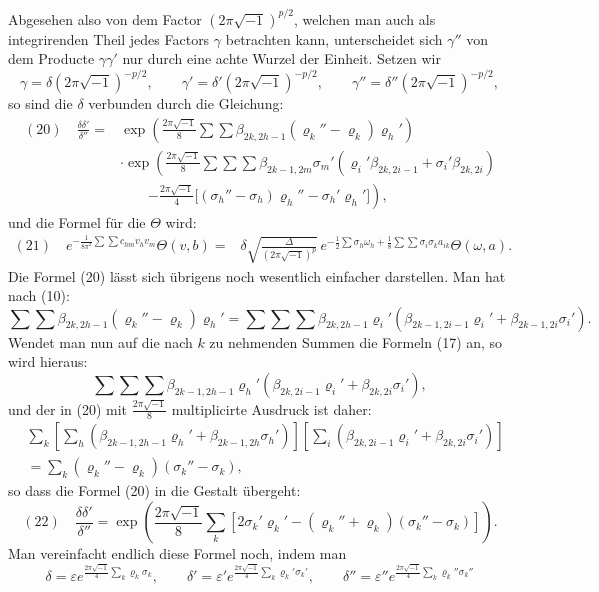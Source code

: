 \documentclass[10pt]{article}
\begin{document}
Abgesehen also von dem Factor \((2\pi\sqrt{-1})^{p/2}\), welchen man auch als integrirenden Theil jedes Factors \(\gamma\) betrachten kann, unterscheidet sich \(\gamma''\) von dem Producte \(\gamma\gamma'\) nur durch eine achte Wurzel der Einheit. Setzen wir
\[
\gamma=\delta(2\pi\sqrt{-1})^{-p/2},\qquad
\gamma'=\delta'(2\pi\sqrt{-1})^{-p/2},\qquad
\gamma''=\delta''(2\pi\sqrt{-1})^{-p/2},
\]
so sind die \(\delta\) verbunden durch die Gleichung:
\[
\begin{aligned}
(20)\quad
\frac{\delta\delta'}{\delta''}
={}&\exp\!\left(\frac{2\pi\sqrt{-1}}{8}\sum\sum\beta_{2k,2h-1}(\varrho_k''-\varrho_k)\varrho_h'\right)\\
&\cdot\exp\!\left(
\frac{2\pi\sqrt{-1}}{8}\sum\sum\sum\beta_{2k-1,2m}\sigma_m'(\varrho_i'\beta_{2k,2i-1}+\sigma_i'\beta_{2k,2i})
\right.\\
&\qquad\left.
-\frac{2\pi\sqrt{-1}}{4}\bigl[(\sigma_h''-\sigma_h)\varrho_h''-\sigma_h'\varrho_h'\bigr]\right),
\end{aligned}
\]
und die Formel für die \(\Theta\) wird:
\[
\begin{aligned}
(21)\quad
e^{-\frac{1}{8\pi^2}\sum\sum c_{hm}v_hv_m}\Theta(v,b)
={}&\delta\sqrt{\frac{\Delta}{(2\pi\sqrt{-1})^p}}\,
 e^{-\frac12\sum\sigma_h\omega_h+\frac18\sum\sum\sigma_i\sigma_ka_{ik}}\Theta(\omega,a).
\end{aligned}
\]
Die Formel (20) lässt sich übrigens noch wesentlich einfacher darstellen. Man hat nach (10):
\[
\sum\sum\beta_{2k,2h-1}(\varrho_k''-\varrho_k)\varrho_h'
=\sum\sum\sum\beta_{2k,2h-1}\varrho_i'(\beta_{2k-1,2i-1}\varrho_i'+\beta_{2k-1,2i}\sigma_i').
\]
Wendet man nun auf die nach \(k\) zu nehmenden Summen die Formeln (17) an, so wird hieraus:
\[
\sum\sum\sum\beta_{2k-1,2h-1}\varrho_h'(\beta_{2k,2i-1}\varrho_i'+\beta_{2k,2i}\sigma_i'),
\]
und der in (20) mit \(\frac{2\pi\sqrt{-1}}8\) multiplicirte Ausdruck ist daher:
\[
\begin{aligned}
&\sum_k\left[\sum_h(\beta_{2k-1,2h-1}\varrho_h'+\beta_{2k-1,2h}\sigma_h')\right]
\left[\sum_i(\beta_{2k,2i-1}\varrho_i'+\beta_{2k,2i}\sigma_i')\right]\\
&=\sum_k(\varrho_k''-\varrho_k)(\sigma_k''-\sigma_k),
\end{aligned}
\]
so dass die Formel (20) in die Gestalt übergeht:
\[
(22)\quad
\frac{\delta\delta'}{\delta''}
=\exp\!\left(\frac{2\pi\sqrt{-1}}8\sum_k[2\sigma_k'\varrho_k'-(\varrho_k''+\varrho_k)(\sigma_k''-\sigma_k)]\right).
\]
Man vereinfacht endlich diese Formel noch, indem man
\[
\delta=\varepsilon e^{\frac{2\pi\sqrt{-1}}4\sum_k\varrho_k\sigma_k},
\qquad
\delta'=\varepsilon' e^{\frac{2\pi\sqrt{-1}}4\sum_k\varrho_k'\sigma_k'},
\qquad
\delta''=\varepsilon'' e^{\frac{2\pi\sqrt{-1}}4\sum_k\varrho_k''\sigma_k''}
\]
\end{document}
